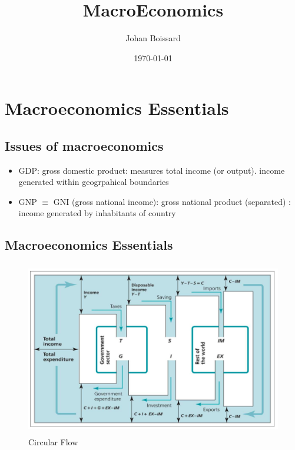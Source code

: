 \documentclass[a4paper] {scrartcl}
\author{Johan Boissard}
\date{\today}
\title{MacroEconomics}
\begin{document}
\maketitle


\section{Macroeconomics Essentials} %
\label{sec:macroeconomics_essentials}


\subsection{Issues of macroeconomics} %
\label{sub:issues_of_macroeconomics}



\begin{itemize}
	\item GDP: gross domestic product: measures total income (or output). income generated within geogrpahical boundaries
	\item GNP $\equiv$ GNI (gross national income): gross national product (separated) : income generated by inhabitants of country
\end{itemize}




\subsection{Macroeconomics Essentials} %
\label{sub:macroeconomics_essentials}


\begin{figure}[htbp]
	\centering
		\includegraphics[height=3in]{images/circularflow.png}
	\caption{Circular Flow}
	\label{fig:images_circularflow}
\end{figure}
\end{document}
